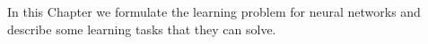 
In this Chapter we formulate the learning problem for neural networks and describe some learning tasks that they can solve. 
